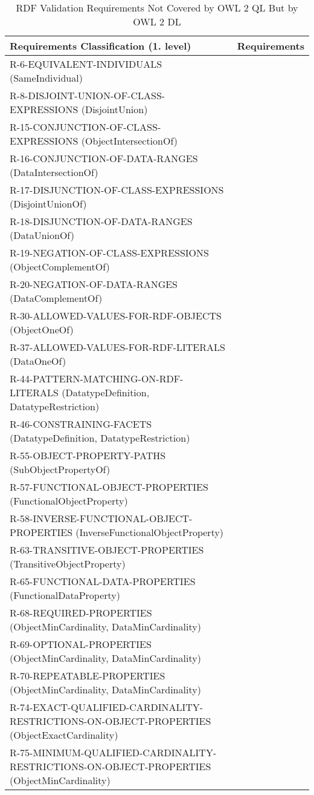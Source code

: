 \documentclass{llncs}
\newcommand{\hr}{\hline\noalign{\smallskip}} %
\begin{document}
\begin{table}
\caption{RDF Validation Requirements Not Covered by OWL 2 QL But by OWL 2 DL}
\label{tab:RequirementsCoveredOWL2DL}
\centering
\begin{tabular}{ll}
\hr
Requirements Classification (1. level) & Requirements \\
\hr
R-6-EQUIVALENT-INDIVIDUALS (SameIndividual) \\
R-8-DISJOINT-UNION-OF-CLASS-EXPRESSIONS (DisjointUnion) \\
R-15-CONJUNCTION-OF-CLASS-EXPRESSIONS (ObjectIntersectionOf) \\
R-16-CONJUNCTION-OF-DATA-RANGES (DataIntersectionOf) \\
R-17-DISJUNCTION-OF-CLASS-EXPRESSIONS (DisjointUnionOf) \\
R-18-DISJUNCTION-OF-DATA-RANGES (DataUnionOf) \\
R-19-NEGATION-OF-CLASS-EXPRESSIONS (ObjectComplementOf) \\
R-20-NEGATION-OF-DATA-RANGES (DataComplementOf) \\
R-30-ALLOWED-VALUES-FOR-RDF-OBJECTS (ObjectOneOf) \\
R-37-ALLOWED-VALUES-FOR-RDF-LITERALS (DataOneOf) \\
R-44-PATTERN-MATCHING-ON-RDF-LITERALS (DatatypeDefinition, DatatypeRestriction) \\
R-46-CONSTRAINING-FACETS (DatatypeDefinition, DatatypeRestriction) \\
R-55-OBJECT-PROPERTY-PATHS (SubObjectPropertyOf) \\
R-57-FUNCTIONAL-OBJECT-PROPERTIES (FunctionalObjectProperty) \\
R-58-INVERSE-FUNCTIONAL-OBJECT-PROPERTIES (InverseFunctionalObjectProperty) \\
R-63-TRANSITIVE-OBJECT-PROPERTIES (TransitiveObjectProperty) \\
R-65-FUNCTIONAL-DATA-PROPERTIES (FunctionalDataProperty) \\
R-68-REQUIRED-PROPERTIES (ObjectMinCardinality, DataMinCardinality) \\
R-69-OPTIONAL-PROPERTIES  (ObjectMinCardinality, DataMinCardinality) \\
R-70-REPEATABLE-PROPERTIES (ObjectMinCardinality, DataMinCardinality) \\
R-74-EXACT-QUALIFIED-CARDINALITY-RESTRICTIONS-ON-OBJECT-PROPERTIES (ObjectExactCardinality) \\
R-75-MINIMUM-QUALIFIED-CARDINALITY-RESTRICTIONS-ON-OBJECT-PROPERTIES (ObjectMinCardinality) \\

\end{tabular}
\end{table}
\end{document}
